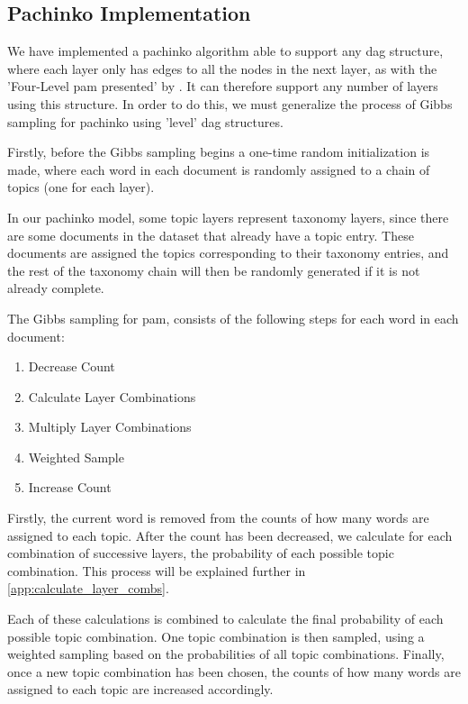 \subsection{Pachinko Implementation}
We have implemented a pachinko algorithm able to support any \gls{dag} structure, where each layer only has edges to all the nodes in the next layer, as with the 'Four-Level \gls{pam} presented' by \citet{li2006pachinko}.
It can therefore support any number of layers using this structure.
In order to do this, we must generalize the process of Gibbs sampling for pachinko using 'level' \gls{dag} structures.

Firstly, before the Gibbs sampling begins a one-time random initialization is made, where each word in each document is randomly assigned to a chain of topics (one for each layer).

In our pachinko model, some topic layers represent taxonomy layers, since there are some documents in the dataset that already have a topic entry.
These documents are assigned the topics corresponding to their taxonomy entries, and the rest of the taxonomy chain will then be randomly generated if it is not already complete.

The Gibbs sampling for \gls{pam}, consists of the following steps for each word in each document:

\begin{enumerate}
	\item Decrease Count
	\item Calculate Layer Combinations
	\item Multiply Layer Combinations
	\item Weighted Sample
	\item Increase Count
\end{enumerate}

Firstly, the current word is removed from the counts of how many words are assigned to each topic.
After the count has been decreased, we calculate for each combination of successive layers, the probability of each possible topic combination.
This process will be explained further in \autoref{app:calculate_layer_combs}.

Each of these calculations is combined to calculate the final probability of each possible topic combination.
One topic combination is then sampled, using a weighted sampling based on the probabilities of all topic combinations.
Finally, once a new topic combination has been chosen, the counts of how many words are assigned to each topic are increased accordingly.

